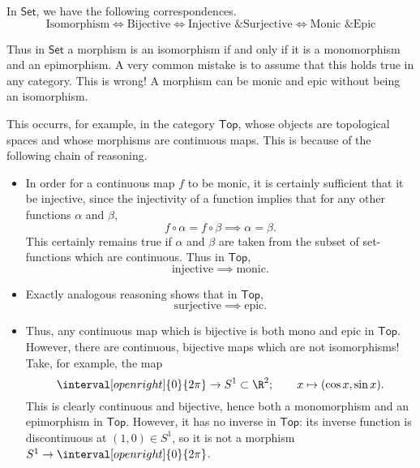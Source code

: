 \documentclass[main.tex]{subfiles}
\begin{document}
\begin{note}
  In $\mathsf{Set}$, we have the following correspondences.
  \begin{equation*}
    \text{Isomorphism} \iff \text{Bijective} \iff \text{Injective \& Surjective} \iff \text{Monic \& Epic}
  \end{equation*}

  Thus in $\mathsf{Set}$ a morphism is an isomorphism if and only if it is a monomorphism and an epimorphism. A very common mistake is to assume that this holds true in any category. This is wrong! A morphism can be monic and epic without being an isomorphism.

  This occurrs, for example, in the category $\mathsf{Top}$, whose objects are topological spaces and whose morphisms are continuous maps. This is because of the following chain of reasoning.

  \begin{itemize}
    \item In order for a continuous map $f$ to be monic, it is certainly sufficient that it be injective, since the injectivity of a function implies that for any other functions $\alpha$ and $\beta$,
      \begin{equation*}
        f \circ \alpha = f \circ \beta \implies \alpha = \beta.
      \end{equation*}
      This certainly remains true if $\alpha$ and $\beta$ are taken from the subset of set-functions which are continuous. Thus in $\mathsf{Top}$,
      \begin{equation*}
        \text{injective} \implies \text{monic}.
      \end{equation*}

    \item Exactly analogous reasoning shows that in $\mathsf{Top}$,
      \begin{equation*}
        \text{surjective} \implies \text{epic}.
      \end{equation*}

    \item Thus, any continuous map which is bijective is both mono and epic in $\mathsf{Top}$. However, there are continuous, bijective maps which are not isomorphisms! Take, for example, the map
      \begin{equation*}
        \interval[open right]{0}{2 \pi} \to S^{1} \subset \R^{2};\qquad x \mapsto (\cos x, \sin x).
      \end{equation*}
      This is clearly continuous and bijective, hence both a monomorphism and an epimorphism in $\mathsf{Top}$. However, it has no inverse in $\mathsf{Top}$: its inverse function is discontinuous at $(1, 0) \in S^{1}$, so it is not a morphism $S^{1} \to \interval[open right]{0}{2 \pi}$.
  \end{itemize}
\end{note}
\end{document}
